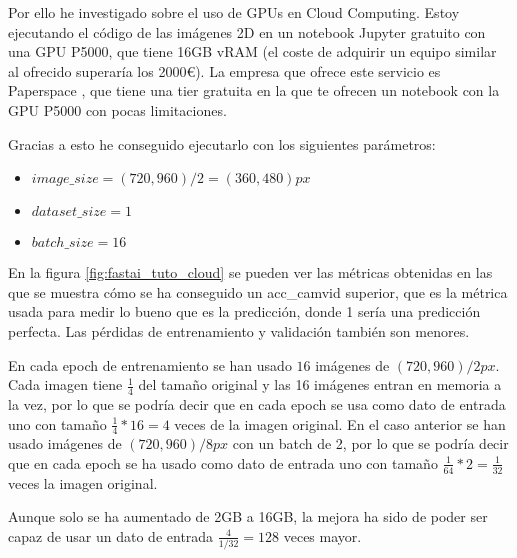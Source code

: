 Por ello he investigado sobre el uso de GPUs en Cloud Computing. Estoy ejecutando el código de las imágenes 2D en un notebook Jupyter gratuito con una GPU P5000, que tiene 16GB vRAM (el coste de adquirir un equipo similar al ofrecido superaría los 2000€). La empresa que ofrece este servicio es Paperspace \cite{Paperspace2020}, que tiene una tier gratuita en la que te ofrecen un notebook con la GPU P5000 con pocas limitaciones.

Gracias a esto he conseguido ejecutarlo con los siguientes parámetros:

\begin{itemize}
\item $image\_size = (720, 960) / 2 = (360, 480)px$
\item $dataset\_size = 1$
\item $batch\_size = 16$
\end{itemize}


En la figura \ref{fig:fastai_tuto_cloud} se pueden ver las métricas obtenidas en las que se muestra cómo se ha conseguido un acc\_camvid superior, que es la métrica usada para medir lo bueno que es la predicción, donde 1 sería una predicción perfecta. Las pérdidas de entrenamiento y validación también son menores.

En cada epoch de entrenamiento se han usado $16$ imágenes de $(720, 960) / 2px$. Cada imagen tiene $\frac{1}{4}$ del tamaño original y las 16 imágenes entran en memoria a la vez, por lo que se podría decir que en cada epoch se usa como dato de entrada uno con tamaño $\frac{1}{4}*16=4$ veces de la imagen original. En el caso anterior se han usado imágenes de $(720, 960) / 8 px$ con un batch de 2, por lo que se podría decir que en cada epoch se ha usado como dato de entrada uno con tamaño $\frac{1}{64}*2=\frac{1}{32}$ veces la imagen original.

Aunque solo se ha aumentado de 2GB a 16GB, la mejora ha sido de poder ser capaz de usar un dato de entrada $\frac{4}{1/32} = 128$ veces mayor. 

